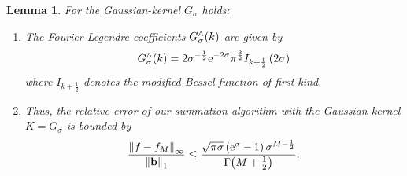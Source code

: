 \documentclass[11pt,a4paper,twoside,bibtotoc]{scrartcl}
\theoremstyle{plain}
\newtheorem{lemma}[theorem]{Lemma}
\theoremstyle{definition}
\theoremstyle{remark}
\newcommand{\fun}[2]{\ensuremath{#1{\hspace{-0.4ex}}\left(#2\right)}}
\newcommand{\mb}[1]{\mathbf{#1}}
\newcommand{\V}[1]{\mb{#1}}
\newcommand{\e}{\mbox{\rm{e}}}
\numberwithin{equation}{section}
\numberwithin{table}{section}
\numberwithin{figure}{section}
\begin{document}
\begin{lemma}
For the Gaussian-kernel $G_{\sigma}$ holds:
  \begin{enumerate}
  \item The Fourier-Legendre coefficients $\fun{G_{\sigma}^{\wedge}}{k}$
    are given by
    \[
    \fun{G_{\sigma}^{\wedge}}{k} = 2 \sigma^{-\frac{1}{2}} \e^{-2\sigma}
    \pi^{\frac{3}{2}} I_{k+\frac{1}{2}}\left(2\sigma\right)
    \]
    where $I_{k+\frac{1}{2}}$ denotes the modified Bessel function of first
    kind.
  \item Thus, the relative error of our summation algorithm with the Gaussian
    kernel $K=G_{\sigma}$ is bounded by
    \begin{equation}
      \label{error:G}
      \frac{\left\|f - f_{M}\right\|_{\infty}}{\left\|\V{b}\right\|_1} \le
      \frac{\sqrt{\pi\sigma}\left(\e^{\sigma}-1\right) \sigma^{M-\frac{1}{2}}}{\fun{\Gamma}{M
          +\frac{1}{2}}}.
    \end{equation} 
\end{enumerate}
\end{lemma}
\end{document}
